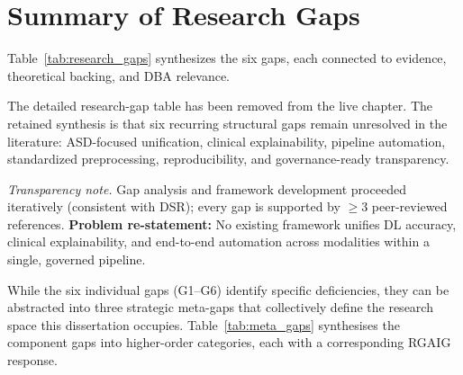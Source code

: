 \section{Summary of Research Gaps}

Table~\ref{tab:research_gaps} synthesizes the six gaps, each connected to evidence, theoretical backing, and DBA relevance.

\noindent The detailed research-gap table has been removed from the live chapter. The retained synthesis is that six recurring structural gaps remain unresolved in the literature: ASD-focused unification, clinical explainability, pipeline automation, standardized preprocessing, reproducibility, and governance-ready transparency.

\noindent\textit{Transparency note.} Gap analysis and framework development proceeded iteratively (consistent with DSR); every gap is supported by $\geq$3 peer-reviewed references. \textbf{Problem re-statement:} No existing framework unifies DL accuracy, clinical explainability, and end-to-end automation across modalities within a single, governed pipeline.

While the six individual gaps (G1--G6) identify specific deficiencies, they can be abstracted into three strategic meta-gaps that collectively define the research space this dissertation occupies. Table~\ref{tab:meta_gaps} synthesises the component gaps into higher-order categories, each with a corresponding RGAIG response.

